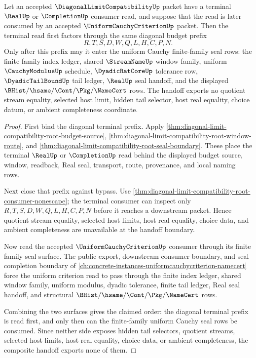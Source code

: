\begin{theorem}
\label{thm:diagonal-limit-compatibility-uniform-cauchy-terminal-handoff}
Let an accepted $\DiagonalLimitCompatibilityUp$ packet have a terminal
$\RealUp$ or $\CompletionUp$ consumer read, and suppose that the read is later
consumed by an accepted $\UniformCauchyCriterionUp$ packet. Then the terminal
read first factors through the same diagonal budget prefix
$$
R,T,S,D,W,Q,L,H,C,P,N.
$$
Only after this prefix may it enter the uniform Cauchy finite-family seal rows:
the finite family index ledger, shared $\StreamNameUp$ window family, uniform
$\CauchyModulusUp$ schedule, $\DyadicRatCoreUp$ tolerance row,
$\DyadicTailBoundUp$ tail ledger, $\RealUp$ seal handoff, and the displayed
$\BHist/\hsame/\Cont/\Pkg/\NameCert$ rows. The handoff exports no quotient
stream equality, selected host limit, hidden tail selector, host real equality,
choice datum, or ambient completeness coordinate.
\end{theorem}
\begin{proof}
First bind the diagonal terminal prefix. Apply
\autoref{thm:diagonal-limit-compatibility-root-budget-source},
\autoref{thm:diagonal-limit-compatibility-root-window-route}, and
\autoref{thm:diagonal-limit-compatibility-root-seal-boundary}. These place the
terminal $\RealUp$ or $\CompletionUp$ read behind the displayed budget source,
window, readback, Real seal, transport, route, provenance, and local naming
rows.

Next close that prefix against bypass. Use
\autoref{thm:diagonal-limit-compatibility-root-consumer-nonescape}; the
terminal consumer can inspect only $R,T,S,D,W,Q,L,H,C,P,N$ before it reaches a
downstream packet. Hence quotient stream equality, selected host limits, host
real equality, choice data, and ambient completeness are unavailable at the
handoff boundary.

Now read the accepted $\UniformCauchyCriterionUp$ consumer through its finite
family seal surface. The public export, downstream consumer boundary, and seal
completion boundary of \autoref{ch:concrete-instances-uniformcauchycriterion-namecert}
force the uniform criterion read to pass through the finite index ledger,
shared window family, uniform modulus, dyadic tolerance, finite tail ledger,
Real seal handoff, and structural $\BHist/\hsame/\Cont/\Pkg/\NameCert$ rows.

Combining the two surfaces gives the claimed order: the diagonal terminal
prefix is read first, and only then can the finite-family uniform Cauchy seal
rows be consumed. Since neither side exposes hidden tail selectors, quotient
streams, selected host limits, host real equality, choice data, or ambient
completeness, the composite handoff exports none of them.
\end{proof}

